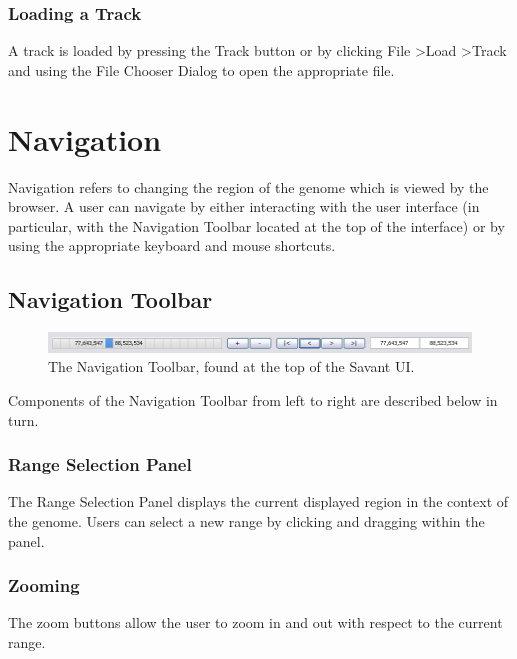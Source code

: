 \documentclass{report}
\begin{document}
\subsection{Loading a Track}

A track is loaded by pressing the Track button or by clicking File \textgreater Load \textgreater Track and using the File Chooser Dialog to open the appropriate file.

\chapter{Navigation}

Navigation refers to changing the region of the genome which is viewed by the browser. A user can navigate by either interacting with the user interface (in particular, with the Navigation Toolbar located at the top of the interface) or by using the appropriate keyboard and mouse shortcuts.

\section{Navigation Toolbar}

\begin{figure}[!h]
\begin{center}
\includegraphics[type=png,ext=.png,read=.png,width=16cm]{images/rangecontrolpanel}
\caption{The Navigation Toolbar, found at the top of the Savant UI.}
\label{rangecontrolpanel}
\end{center}
\end{figure}

Components of the Navigation Toolbar from left to right are described below in turn.

\subsection{Range Selection Panel}

The Range Selection Panel displays the current displayed region in the context of the genome. Users can select a new range by clicking and dragging within the panel.

\subsection{Zooming}

The zoom buttons allow the user to zoom in and out with respect to the current range. 
\end{document}

